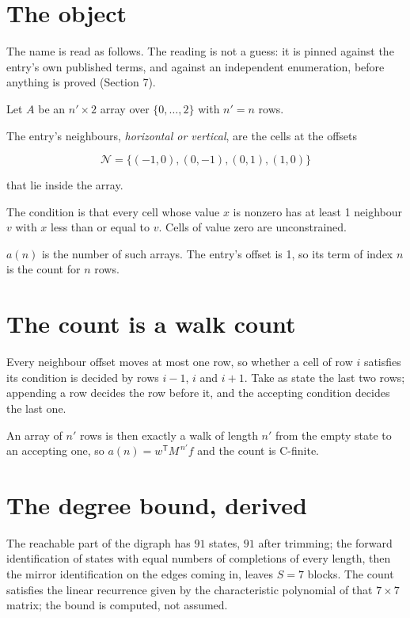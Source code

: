 \documentclass[11pt]{article}
\theoremstyle{definition}
\begin{document}
\section{The object}

The name is read as follows. The reading is not a guess: it is pinned against the entry's own published terms, and against an independent enumeration, before anything is proved (Section 7).

Let $A$ be an $n' \times 2$ array over $\{0,\dots,2\}$ with $n' = n$ rows.

The entry's neighbours, {\itshape horizontal or vertical}, are the cells at the offsets

\[\mathcal{N} = \{(-1,0), (0,-1), (0,1), (1,0)\}\]

that lie inside the array.

The condition is that every cell whose value $x$ is nonzero has at least 1 neighbour $v$ with $x$ less than or equal to $v$. Cells of value zero are unconstrained.

$a(n)$ is the number of such arrays. The entry's offset is 1, so its term of index $n$ is the count for $n$ rows.

\section{The count is a walk count}

Every neighbour offset moves at most one row, so whether a cell of row $i$ satisfies its condition is decided by rows $i-1$, $i$ and $i+1$. Take as state the last two rows; appending a row decides the row before it, and the accepting condition decides the last one.

An array of $n'$ rows is then exactly a walk of length $n'$ from the empty state to an accepting one, so $a(n) = w^{\mathsf T}M^{\,n'}f$ and the count is C-finite.

\section{The degree bound, derived}

The reachable part of the digraph has $91$ states, $91$ after trimming; the forward identification of states with equal numbers of completions of every length, then the mirror identification on the edges coming in, leaves $S = 7$ blocks. The count satisfies the linear recurrence given by the characteristic polynomial of that $7\times7$ matrix; the bound is computed, not assumed.
\end{document}
